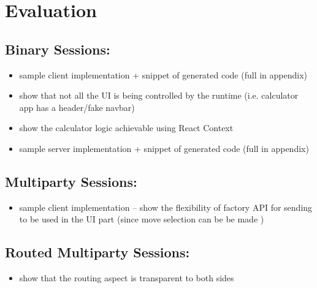 \chapter{Evaluation}
\label{chap:eval}

\section{Binary Sessions: }
\label{section:evalcalculator}
\begin{itemize}
\item sample client implementation + snippet of generated code (full in appendix)
\item show that not all the UI is being controlled by the runtime (i.e. calculator app has a header/fake navbar)
\item show the calculator logic achievable using React Context
\item sample server implementation + snippet of generated code (full in appendix)
\end{itemize}

\section{Multiparty Sessions: }
\label{section:evalgame}
\begin{itemize}
\item sample client implementation -- show the flexibility of factory API for sending to be used in the UI part (since move selection can be be made )
\end{itemize}

\section{Routed Multiparty Sessions: }
\begin{itemize}
\item show that the routing aspect is transparent to both sides
\end{itemize}

